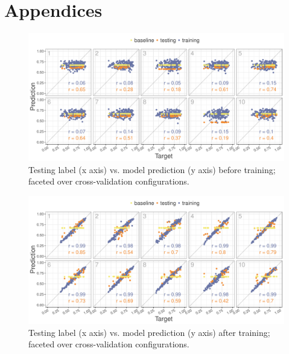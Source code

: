 \documentclass[11pt,a4paper]{article}
\begin{document}





\onecolumn
\section{Appendices}
\label{sec:appendix}

\begin{figure}[!htb]
	\includegraphics[width=\linewidth]{graphs/all-pred-target-epoch1.pdf}
	\caption{Testing label (x axis) vs. model prediction (y axis) before training; faceted over cross-validation configurations.}
	\label{fig:app-corr-pretraining}
\end{figure}

\begin{figure}[!htb]
	\includegraphics[width=\linewidth]{graphs/all-pred-target-epoch30.pdf}
	\caption{Testing label (x axis) vs. model prediction (y axis) after training; faceted over cross-validation configurations.}
	\label{fig:app-corr-posttraining}
\end{figure}
\end{document}
